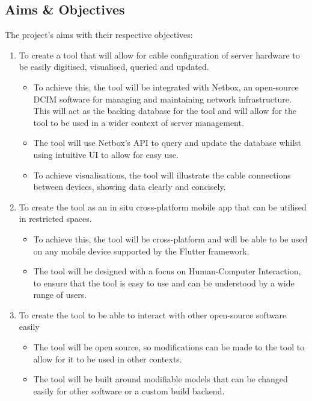 \documentclass [11pt,a4paper]{article}
\begin{document}
\subsection{Aims \& Objectives}
\label{sec:objectives}
The project's aims with their respective objectives:
\begin{enumerate}[noitemsep, labelindent=0pt, label=\textbf{A\arabic*}]

    \item To create a tool that will allow for cable configuration of server hardware to be
    easily digitised, visualised, queried and updated. 
        
    \begin{itemize}[noitemsep, topsep=0pt]
    \item To achieve this, the tool will be integrated with Netbox, an open-source DCIM software for managing and maintaining network infrastructure. This will act as the backing database for the tool and will allow for the tool to be used in a wider context of server management.

    \item The tool will use Netbox's API to query and update the database whilst using intuitive UI to allow for easy use.
        
    \item To achieve visualisations, the tool will illustrate the cable connections between devices, showing data clearly and concisely.
    \end{itemize}
    \item To create the tool as an in situ cross-platform mobile app that can be utilised in restricted spaces.    
    \begin{itemize}[noitemsep, topsep=0pt]
        \item To achieve this, the tool will be cross-platform and will be able to be used on any mobile device supported by the Flutter framework.
        \item The tool will be designed with a focus on Human-Computer Interaction, to ensure that the tool is easy to use and can be understood by a wide range of users.
    \end{itemize} 

    \item To create the tool to be able to interact with other open-source software easily
    \begin{itemize}[noitemsep, topsep=0pt]
        \item The tool will be open source, so modifications can be made to the tool to allow for it to be used in other contexts.
        \item The tool will be built around modifiable models that can be changed easily for other software or a custom build backend.        
    \end{itemize}
        

\end{enumerate}
\end{document}
